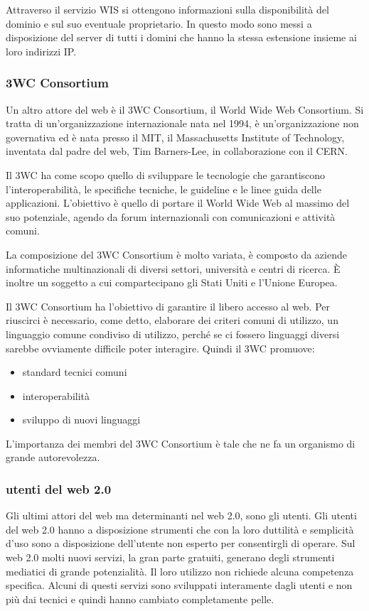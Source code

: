     Attraverso il servizio WIS si ottengono informazioni sulla disponibilità del dominio e sul suo eventuale proprietario. In questo modo sono messi a disposizione del server di tutti i domini che hanno la stessa estensione insieme ai loro indirizzi IP. 
    \subsubsection{3WC Consortium}
    
    Un altro attore del web è il 3WC Consortium, il World Wide Web Consortium. Si tratta di un'organizzazione internazionale nata nel 1994, è un'organizzazione non governativa ed è nata presso il MIT, il Massachusetts Institute of Technology, inventata dal padre del web, Tim Barners-Lee, in collaborazione con il CERN. \par
    Il 3WC ha come scopo quello di sviluppare le tecnologie che garantiscono l'interoperabilità, le specifiche tecniche, le guideline e le linee guida delle applicazioni. L'obiettivo è quello di portare il World Wide Web al massimo del suo potenziale, agendo da forum internazionali con comunicazioni e attività comuni. \par
    La composizione del 3WC Consortium è molto variata, è composto da aziende informatiche multinazionali di diversi settori, università e centri di ricerca. È inoltre un soggetto a cui compartecipano gli Stati Uniti e l'Unione Europea. \par
    Il 3WC Consortium ha l'obiettivo di garantire il libero accesso al web. Per riuscirci è necessario, come detto, elaborare dei criteri comuni di utilizzo, un linguaggio comune condiviso di utilizzo, perché se ci fossero linguaggi diversi sarebbe ovviamente difficile poter interagire. Quindi il 3WC promuove:
    \begin{itemize}
        \item standard tecnici comuni 
        \item interoperabilità 
        \item sviluppo di nuovi linguaggi 
    \end{itemize}
    
    L'importanza dei membri del 3WC Consortium è tale che ne fa un organismo di grande autorevolezza. 
    
    
    \subsubsection{utenti del web 2.0}
    Gli ultimi attori del web ma determinanti nel web 2.0, sono gli utenti. 
    Gli utenti del web 2.0 hanno a disposizione strumenti che con la loro duttilità e semplicità d'uso sono a disposizione dell'utente non esperto per consentirgli di operare. Sul web 2.0 molti nuovi servizi, la gran parte gratuiti, generano degli strumenti mediatici di grande potenzialità. Il loro utilizzo non richiede alcuna competenza specifica. Alcuni di questi servizi sono sviluppati interamente dagli utenti e non più dai tecnici e quindi hanno cambiato completamente pelle.
    
